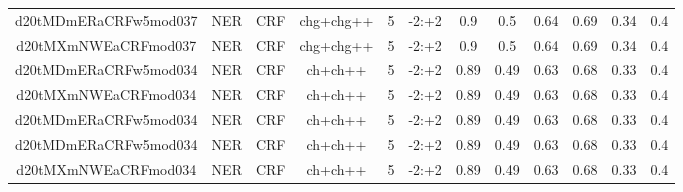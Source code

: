 \documentclass[a4paper]{article}
\begin{document}
\begin{landscape}
\begin{center}
\begin{tabular}{ |c|c|c|c|c|c|c|c|c|c|c|c|}
 	
 
 	
 		
 		\small{ d20tMDmERaCRFw5mod037 } & NER & CRF & chg+chg++  &  5 &  -2:+2  &  0.9 & 0.5 & 0.64  &  0.69 & 0.34 & 0.4 \\
 		

 	
 
 	
 		
 		\small{ d20tMXmNWEaCRFmod037 } & NER & CRF & chg+chg++  &  5 &  -2:+2  &  0.9 & 0.5 & 0.64  &  0.69 & 0.34 & 0.4 \\
 		

 	
 
 	
 		
 		\small{ d20tMDmERaCRFw5mod034 } & NER & CRF & ch+ch++  &  5 &  -2:+2  &  0.89 & 0.49 & 0.63  &  0.68 & 0.33 & 0.4 \\
 		

 	
 
 	
 		
 		\small{ d20tMXmNWEaCRFmod034 } & NER & CRF & ch+ch++  &  5 &  -2:+2  &  0.89 & 0.49 & 0.63  &  0.68 & 0.33 & 0.4 \\
 		

 	
 
 	
 		
 		\small{ d20tMDmERaCRFw5mod034 } & NER & CRF & ch+ch++  &  5 &  -2:+2  &  0.89 & 0.49 & 0.63  &  0.68 & 0.33 & 0.4 \\
 		

 	
 
 	
 		
 		\small{ d20tMDmERaCRFw5mod034 } & NER & CRF & ch+ch++  &  5 &  -2:+2  &  0.89 & 0.49 & 0.63  &  0.68 & 0.33 & 0.4 \\
 		

 	
 
 	
 		
 		\small{ d20tMXmNWEaCRFmod034 } & NER & CRF & ch+ch++  &  5 &  -2:+2  &  0.89 & 0.49 & 0.63  &  0.68 & 0.33 & 0.4 \\
 		

 	
 
 	
 
 	
 
 	
 
 	
 
 	
 
 	
 
 	
 
 	
 
 	
 
 	
 
 	
 

\end{tabular}
\end{center}
\end{landscape}
\end{document}

